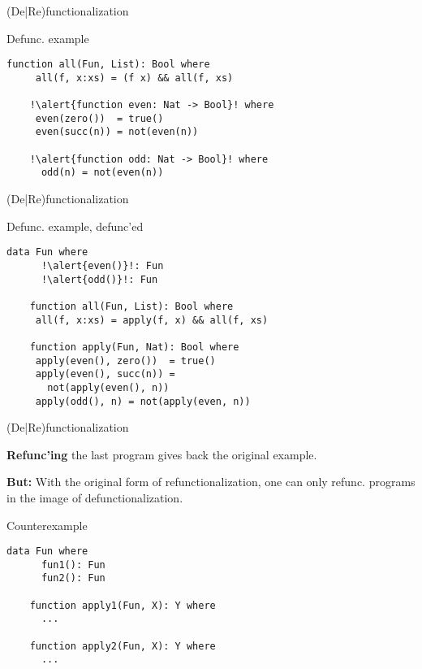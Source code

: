 \documentclass[xcolor=svgnames]{beamer}
\begin{document}
\begin{frame}[fragile]
  {(De|Re)functionalization}

  \begin{block}{Defunc. example}
    \begin{lstlisting}[escapechar=!]
    function all(Fun, List): Bool where
     all(f, x:xs) = (f x) && all(f, xs)

    !\alert{function even: Nat -> Bool}! where
     even(zero())  = true()
     even(succ(n)) = not(even(n))

    !\alert{function odd: Nat -> Bool}! where
      odd(n) = not(even(n))
    \end{lstlisting}
  \end{block}
\end{frame}

\begin{frame}[fragile]
  {(De|Re)functionalization}

  \begin{block}{Defunc. example, defunc'ed}
    \begin{lstlisting}[escapechar=!]
    data Fun where
      !\alert{even()}!: Fun
      !\alert{odd()}!: Fun

    function all(Fun, List): Bool where
     all(f, x:xs) = apply(f, x) && all(f, xs)

    function apply(Fun, Nat): Bool where
     apply(even(), zero())  = true()
     apply(even(), succ(n)) =
       not(apply(even(), n))
     apply(odd(), n) = not(apply(even, n))
    \end{lstlisting}
  \end{block}
\end{frame}

\begin{frame}[fragile]
  {(De|Re)functionalization}

  \textbf{Refunc'ing} the last program gives back the original example.

  \textbf{But:} With the original form of refunctionalization, one can only refunc. programs in the image of defunctionalization.

  \begin{block}{Counterexample}
    \begin{lstlisting}[escapechar=!]
    data Fun where
      fun1(): Fun
      fun2(): Fun

    function apply1(Fun, X): Y where
      ...
    
    function apply2(Fun, X): Y where
      ...
    \end{lstlisting}
  \end{block}
\end{frame}
\end{document}
